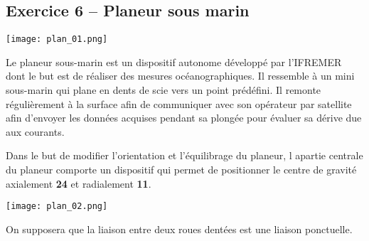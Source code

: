 \subsection*{Exercice 6 -- Planeur sous marin}


\begin{marginfigure}
\texttt{[image: plan\_01.png]}
\end{marginfigure}

Le planeur sous-marin est un dispositif autonome développé par l'IFREMER dont le but est de réaliser des mesures océanographiques. Il ressemble à un mini sous-marin qui plane en dents de scie vers un point prédéfini. Il remonte régulièrement à la surface afin de communiquer avec son opérateur par satellite afin d'envoyer les données acquises pendant sa plongée pour évaluer sa dérive due aux courants. 


Dans le but de modifier l'orientation et l'équilibrage du planeur, l apartie centrale du planeur comporte un dispositif qui permet de positionner le centre de gravité axialement \textbf{24} et radialement \textbf{11}. 


\begin{center}
\texttt{[image: plan\_02.png]}
\end{center}


\ifprof
\begin{corrige}
\end{corrige}\else\fi

On supposera que la liaison entre deux roues dentées est une liaison ponctuelle. 


\ifprof
\begin{corrige}
\end{corrige}\else\fi


